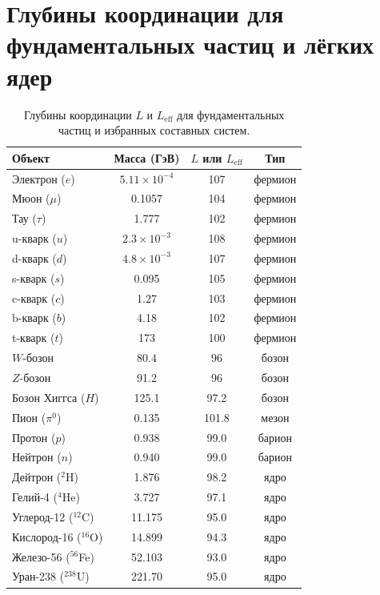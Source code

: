 \documentclass[11pt,a4paper]{article}
\begin{document}
	\section*{Глубины координации для фундаментальных частиц и лёгких ядер}
	\begin{table}[H]
		\centering
		\caption{Глубины координации \(L\) и \(L_{\mathrm{eff}}\) для фундаментальных частиц и избранных составных систем.}
		\label{tab:depths_particles}
		\small
		\begin{tabular}{l c c c}
			\toprule
			\textbf{Объект} & \textbf{Масса (ГэВ)} & \textbf{\(L\) или \(L_{\mathrm{eff}}\)} & \textbf{Тип} \\
			\midrule
			Электрон (\(e\)) & \(5.11\times10^{-4}\) & 107 & фермион \\
			Мюон (\(\mu\)) & 0.1057 & 104 & фермион \\
			Тау (\(\tau\)) & 1.777 & 102 & фермион \\
			u-кварк (\(u\)) & \(2.3\times10^{-3}\) & 108 & фермион \\
			d-кварк (\(d\)) & \(4.8\times10^{-3}\) & 107 & фермион \\
			s-кварк (\(s\)) & 0.095 & 105 & фермион \\
			c-кварк (\(c\)) & 1.27 & 103 & фермион \\
			b-кварк (\(b\)) & 4.18 & 102 & фермион \\
			t-кварк (\(t\)) & 173 & 100 & фермион \\
			\(W\)-бозон & 80.4 & 96 & бозон \\
			\(Z\)-бозон & 91.2 & 96 & бозон \\
			Бозон Хиггса (\(H\)) & 125.1 & 97.2 & бозон \\
			Пион (\(\pi^0\)) & 0.135 & 101.8 & мезон \\
			Протон (\(p\)) & 0.938 & 99.0 & барион \\
			Нейтрон (\(n\)) & 0.940 & 99.0 & барион \\
			Дейтрон (\(^2\)H) & 1.876 & 98.2 & ядро \\
			Гелий-4 (\(^4\)He) & 3.727 & 97.1 & ядро \\
			Углерод-12 (\(^{12}\)C) & 11.175 & 95.0 & ядро \\
			Кислород-16 (\(^{16}\)O) & 14.899 & 94.3 & ядро \\
			Железо-56 (\(^{56}\)Fe) & 52.103 & 93.0 & ядро \\
			Уран-238 (\(^{238}\)U) & 221.70 & 95.0 & ядро \\
			\bottomrule
		\end{tabular}
	\end{table}
	
\end{document}
